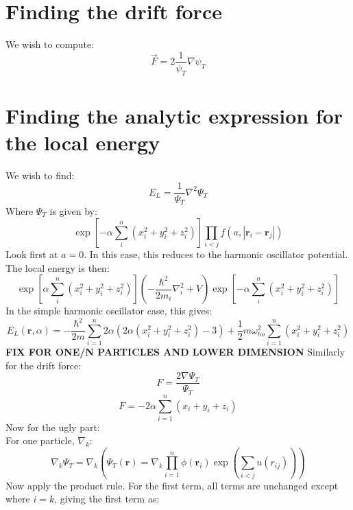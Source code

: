 \documentclass[a4paper, 10pt]{article}
\begin{document}
\begin{appendices}
\section{Finding the drift force}
We wish to compute:
\begin{equation}
\vec{F}=2\frac{1}{\psi_T}\nabla \psi_T
\end{equation}
\section{Finding the analytic expression for the local energy}
We wish to find:
\begin{equation}
E_L=\frac{1}{\Psi_T}\nabla^2 \Psi_T
\end{equation}
Where $\Psi_T$ is given by:
\begin{equation}
\exp\left[ -\alpha \sum_{i}^n\left(x_i^2+y_i^2+z_i^2\right)\right]\prod_{i<j}f(a, |\mathbf{r}_i-\mathbf{r}_j|)
\end{equation}
Look first at $a=0$. In this case, this reduces to the harmonic oscillator potential. The local energy is then:
\begin{equation}
\exp\left[ \alpha \sum_{i}^n\left(x_i^2+y_i^2+z_i^2\right)\right]\left(-\frac{\hbar^2}{2m_i}\nabla_i^2+V\right)\exp\left[ -\alpha \sum_{i}^n\left(x_i^2+y_i^2+z_i^2\right)\right]
\end{equation}
In the simple harmonic oscillator case, this gives:
\begin{equation}
E_L(\mathbf{r},\alpha)=-\frac{\hbar^2}{2m}\sum_{i=1}^n 2\alpha \left(2\alpha(x_i^2+y_i^2+z_i^2)-3\right)+\frac{1}{2}m\omega_{ho}^2\sum_{i=1}^n(x_i^2+y_i^2+z_i^2)
\end{equation}
\textbf{FIX FOR ONE/N PARTICLES AND LOWER DIMENSION}
Similarly for the drift force:
\begin{equation}
F=\frac{2\nabla \Psi_T}{\Psi_T}
\end{equation}
\begin{equation}
F=-2\alpha\sum_{i=1}^n(x_i+y_i+z_i)
\end{equation}
Now for the ugly part:\\
For one particle, $\nabla_k$:
\begin{equation}
\nabla_k\Psi_{T} = \nabla_k\left(\Psi_T(\mathbf{r})=\nabla_k \prod_{i=1}^n\phi(\mathbf{r}_i)\exp\left(\sum_{i<j} u(r_{ij})\right)\right)
\end{equation}
Now apply the product rule. For the first term, all terms are unchanged except where $i=k$, giving the first term as:

\end{appendices}
\end{document}

